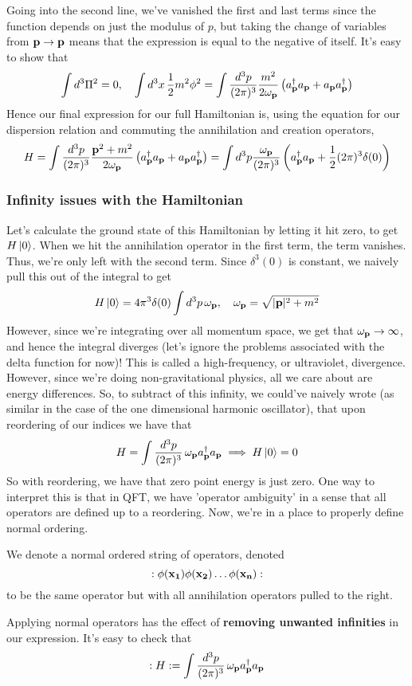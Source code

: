 Going into the second line, we've vanished the first and last terms since the function depends on just the modulus of $p$, but taking the change of variables from $\mathbf{ p} \rightarrow \mathbf{ p } $ means that the expression is equal to the negative of itself. It's easy to show that 
\[\int d^3 \Pi^2  = 0, \quad \int d^3  x \, \frac{ 1}{ 2} m^2 \phi^2 =  \int \frac{d^3 p}{(2 \pi)^3 } \frac{ m^2}{ 2 \omega_\mathbf{  p } }  \left( a_{\mathbf{p}}^\dagger a_{\mathbf{p}} + a_\mathbf{p} a_\mathbf{p}^\dagger \right)  \]
Hence our final expression for our full Hamiltonian is, using the equation for our dispersion relation and commuting the annihilation and creation operators, 
\[
H =  \int \frac{d^3 p}{(2 \pi)^3 } \frac{ \mathbf{p}^2 + m^2 }{ 2 \omega_\mathbf{  p } }  \left( a_{\mathbf{p}}^\dagger a_{\mathbf{p}} + a_\mathbf{p} a_\mathbf{p}^\dagger \right) = \int d^3 p \frac{\omega_\mathbf{p}}{(2 \pi)^3 } \left( a_\mathbf{p}^\dagger a_\mathbf{p} + \frac{1}{2}(2 \pi )^3 \delta (0) \right)
\] 

\subsubsection{Infinity issues with the Hamiltonian} 
Let's calculate the ground state of this Hamiltonian by letting it hit zero, to get $H \ket{ 0 } $. When we hit the annihilation operator in the first term, the term vanishes. Thus, we're only left with the second term. Since $\delta^ 3 ( 0 ) $ is constant, we naively pull this out of the integral to get 
\[ 
H \ket{0 }  = 4 \pi^3 \delta ( 0 ) \int d^3 p\,  \omega_\mathbf{ p }, \quad \omega_\mathbf{  p }  = \sqrt{ | \mathbf{ p } |^2 + m^2 }
\] 
However, since we're integrating over all momentum space, we get that $\omega_\mathbf{ p} \rightarrow \infty $, and hence the integral diverges (let's ignore the problems associated with the delta function for now)! This is called a high-frequency, or ultraviolet, divergence. However, since we're doing non-gravitational physics, all we care about are energy differences. So, to subtract of this infinity, we could've naively wrote (as similar in the case of the one dimensional harmonic oscillator), that upon reordering of our indices we have that 
\[ 
H = \int \frac{ d^3 p }{ (2 \pi)^3 } \, \omega_\mathbf{ p } a^\dagger_{ \mathbf{ p }} a_{ \mathbf{ p }} \implies H \ket{ 0 } = 0 
\] So with reordering, we have that zero point energy is just zero. One way to interpret this is that in QFT, we have 'operator ambiguity' in a sense that all operators are defined up to a reordering. Now, we're in a place to properly define normal ordering. 

\begin{defn} 
We denote a normal ordered string of operators, denoted 
\[ 
: \phi ( \mathbf{  x_1  }) \phi ( \mathbf{ x_2  }) \dots \phi ( \mathbf{ x_n }) : 
\] to be the same operator but with all annihilation operators pulled to the right. 
\end{defn} 
Applying normal operators has the effect of \textbf{removing unwanted infinities} in our expression. It's easy to check that 
\[ 
: H :  =\int \frac{ d^3 p }{ (2 \pi)^3 } \, \omega_\mathbf{ p } a^\dagger_{ \mathbf{ p }} a_{ \mathbf{  p  }} 
\] 

